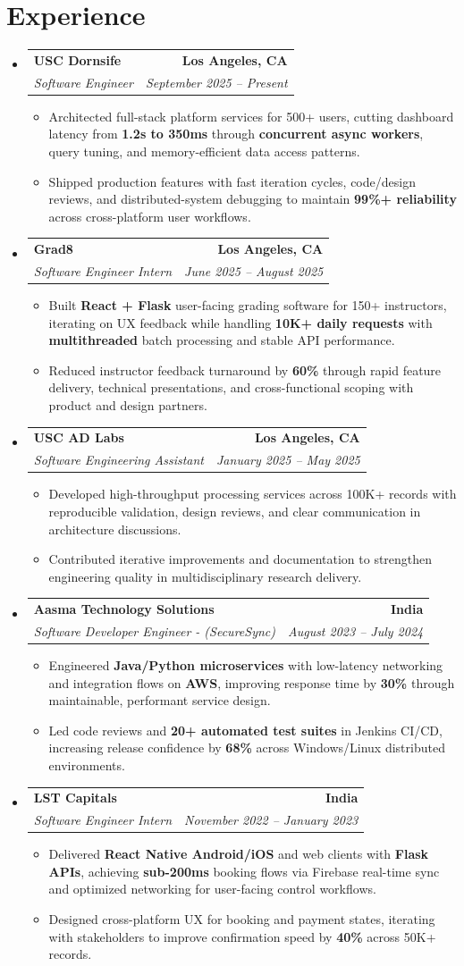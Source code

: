 \documentclass[letterpaper,10pt]{article}
\makeatletter
\newcommand{\resumeItem}[1]{\item\small{{#1 \vspace{-2pt}}}}
\newcommand{\resumeSubheading}[4]{\vspace{-1pt}\item\begin{tabular*}{1.0\textwidth}[t]{l@{\extracolsep{\fill}}r}\textbf{#1} & \textbf{\small #2} \\\textit{\small#3} & \textit{\small #4} \\\end{tabular*}\vspace{-2pt}}
\newcommand{\resumeSubHeadingListStart}{\begin{itemize}[leftmargin=0.0in, label={}]}
\newcommand{\resumeSubHeadingListEnd}{\end{itemize}}
\newcommand{\resumeItemListStart}{\begin{itemize}[leftmargin=0.15in,label=\textbullet,itemsep=2pt,topsep=0pt,parsep=0pt,partopsep=0pt]}
\newcommand{\resumeItemListEnd}{\end{itemize}\vspace{-4pt}}
\makeatother
\begin{document}
\section{Experience}
\resumeSubHeadingListStart
\resumeSubheading{USC Dornsife}{Los Angeles, CA}{Software Engineer}{September 2025 -- Present}
\resumeItemListStart
\resumeItem{Architected full-stack platform services for 500+ users, cutting dashboard latency from \textbf{1.2s to 350ms} through \textbf{concurrent async workers}, query tuning, and memory-efficient data access patterns.}
\resumeItem{Shipped production features with fast iteration cycles, code/design reviews, and distributed-system debugging to maintain \textbf{99\%+ reliability} across cross-platform user workflows.}
\resumeItemListEnd
\resumeSubheading{Grad8}{Los Angeles, CA}{Software Engineer Intern}{June 2025 -- August 2025}
\resumeItemListStart
\resumeItem{Built \textbf{React + Flask} user-facing grading software for 150+ instructors, iterating on UX feedback while handling \textbf{10K+ daily requests} with \textbf{multithreaded} batch processing and stable API performance.}
\resumeItem{Reduced instructor feedback turnaround by \textbf{60\%} through rapid feature delivery, technical presentations, and cross-functional scoping with product and design partners.}
\resumeItemListEnd
\resumeSubheading{USC AD Labs}{Los Angeles, CA}{Software Engineering Assistant}{January 2025 -- May 2025}
\resumeItemListStart
\resumeItem{Developed high-throughput processing services across 100K+ records with reproducible validation, design reviews, and clear communication in architecture discussions.}
\resumeItem{Contributed iterative improvements and documentation to strengthen engineering quality in multidisciplinary research delivery.}
\resumeItemListEnd
\resumeSubheading{Aasma Technology Solutions}{India}{Software Developer Engineer - (SecureSync)}{August 2023 -- July 2024}
\resumeItemListStart
\resumeItem{Engineered \textbf{Java/Python microservices} with low-latency networking and integration flows on \textbf{AWS}, improving response time by \textbf{30\%} through maintainable, performant service design.}
\resumeItem{Led code reviews and \textbf{20+ automated test suites} in Jenkins CI/CD, increasing release confidence by \textbf{68\%} across Windows/Linux distributed environments.}
\resumeItemListEnd
\resumeSubheading{LST Capitals}{India}{Software Engineer Intern}{November 2022 -- January 2023}
\resumeItemListStart
\resumeItem{Delivered \textbf{React Native Android/iOS} and web clients with \textbf{Flask APIs}, achieving \textbf{sub-200ms} booking flows via Firebase real-time sync and optimized networking for user-facing control workflows.}
\resumeItem{Designed cross-platform UX for booking and payment states, iterating with stakeholders to improve confirmation speed by \textbf{40\%} across 50K+ records.}
\resumeItemListEnd
\resumeSubHeadingListEnd
\vspace{-14pt}
\end{document}
